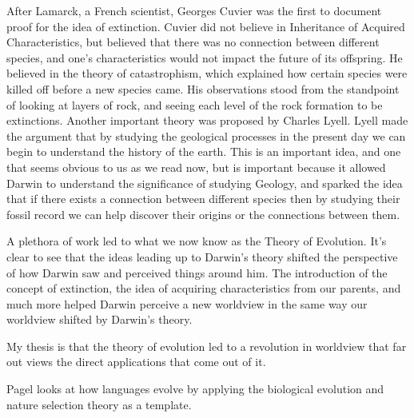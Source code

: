 \documentclass[11pt, oneside]{article}
\begin{document}
\par After Lamarck, a French scientist, Georges Cuvier was the first to document proof for the idea of extinction. Cuvier did not believe in Inheritance of Acquired Characteristics, but believed that there was no connection between different species, and one's characteristics would not impact the future of its offspring. He believed in the theory of catastrophism, which explained how certain species were killed off before a new species came. His observations stood from the standpoint of looking at layers of rock, and seeing each level of the rock formation to be extinctions. Another important theory was proposed by Charles Lyell. Lyell made the argument that by studying the geological processes in the present day we can begin to understand the history of the earth. This is an important idea, and one that seems obvious to us as we read now, but is  important because it allowed Darwin to understand the significance of studying Geology, and sparked the idea that if there exists a connection between different species then by studying their fossil record we can help discover their origins or the connections between them. 

\par A plethora of work led to what we now know as the Theory of Evolution. It's clear to see that the ideas leading up to Darwin's theory shifted the perspective of how Darwin saw and perceived things around him. The introduction of the concept of extinction, the idea of acquiring characteristics from our parents, and much more helped Darwin perceive a new worldview in the same way our worldview shifted by Darwin's theory. 



\par My thesis is that the theory of evolution led to a revolution in worldview that far out views the direct applications that come out of it. 

\par Pagel looks at how languages evolve by applying the biological evolution and nature selection theory as a template. 
\end{document}

